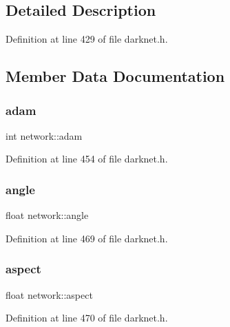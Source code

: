 \subsection{Detailed Description}


Definition at line 429 of file darknet.\+h.



\subsection{Member Data Documentation}
\mbox{\label{structnetwork_a7274661135ee8efe567aef0e9c0e40f9}} 
\subsubsection{\texorpdfstring{adam}{adam}}
{\footnotesize\ttfamily int network\+::adam}



Definition at line 454 of file darknet.\+h.

\mbox{\label{structnetwork_abe286813534c121ee16da09c258eaf2e}} 
\subsubsection{\texorpdfstring{angle}{angle}}
{\footnotesize\ttfamily float network\+::angle}



Definition at line 469 of file darknet.\+h.

\mbox{\label{structnetwork_acaa88cf6c30100edff5dc061bfb226bb}} 
\subsubsection{\texorpdfstring{aspect}{aspect}}
{\footnotesize\ttfamily float network\+::aspect}



Definition at line 470 of file darknet.\+h.

\mbox{\label{structnetwork_a6c56d5eccebbfd39c085766b94cd36b7}} 
